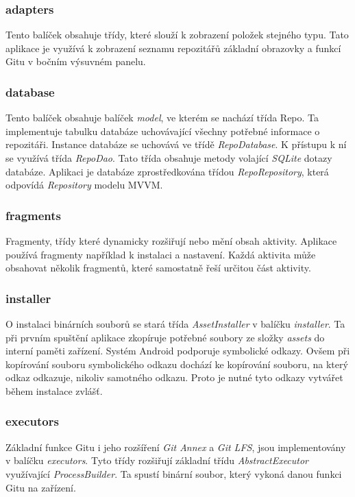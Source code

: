             \subsubsection{adapters}
            Tento balíček obsahuje třídy, které slouží k zobrazení položek stejného typu. Tato aplikace je využívá k zobrazení seznamu repozitářů základní obrazovky a funkcí Gitu v bočním výsuvném panelu.  

            \subsubsection{database}
            Tento balíček obsahuje balíček \emph{model}, ve kterém se nachází třída Repo. Ta implementuje tabulku databáze uchovávající všechny potřebné informace o repozitáři. Instance databáze se uchovává ve třídě \emph{RepoDatabase}. K přístupu k ní se využívá třída \emph{RepoDao}. Tato třída obsahuje metody volající \emph{SQLite} dotazy databáze. Aplikaci je databáze zprostředkována třídou \emph{RepoRepository}, která odpovídá \emph{Repository} modelu MVVM.

            \subsubsection{fragments}
            Fragmenty, třídy které dynamicky rozšiřují nebo mění obsah aktivity. Aplikace používá fragmenty například k instalaci a nastavení. Každá aktivita může obsahovat několik fragmentů, které samostatně řeší určitou část aktivity.

            \subsubsection{installer}
            O instalaci binárních souborů se stará třída \emph{AssetInstaller} v balíčku \emph{installer}. Ta při prvním spuštění aplikace zkopíruje potřebné soubory ze složky \emph{assets} do interní paměti zařízení. Systém Android podporuje symbolické odkazy. Ovšem při kopírování souboru symbolického odkazu dochází ke kopírování souboru, na který odkaz odkazuje, nikoliv samotného odkazu. Proto je nutné tyto odkazy vytvářet během instalace zvlášť.

            \subsubsection{executors}
            Základní funkce Gitu i jeho rozšíření \emph{Git Annex} a \emph{Git LFS}, jsou implementovány v balíčku \emph{executors}. Tyto třídy rozšiřují základní třídu \emph{AbstractExecutor} využívající \emph{ProcessBuilder}. Ta spustí binární soubor, který vykoná danou funkci Gitu na zařízení.

